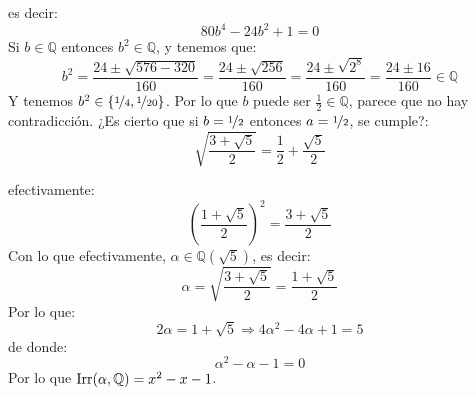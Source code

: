 \begin{ejercicio}
    es decir:
    \begin{equation*}
        80b^4 - 24b^2 +1 = 0 
    \end{equation*}
    Si $b\in \mathbb{Q}$ entonces $b^2\in \mathbb{Q}$, y tenemos que:
    \begin{equation*}
        b^2 = \frac{24 \pm \sqrt{576-320}}{160} = \frac{24\pm \sqrt{256}}{160} = \frac{24\pm\sqrt{2^8}}{160} = \frac{24\pm16}{160} \in \mathbb{Q}
    \end{equation*}
    Y tenemos $b^2 \in \{\nicefrac{1}{4}, \nicefrac{1}{20}\}$. Por lo que $b$ puede ser $\frac{1}{2}\in \mathbb{Q}$, parece que no hay contradicción. ¿Es cierto que si $b = \nicefrac{1}{2}$ entonces $a=\nicefrac{1}{2}$, se cumple?:
    \begin{equation*}
        \sqrt{\frac{3+\sqrt{5}}{2}} = \frac{1}{2} + \frac{\sqrt{5}}{2}
    \end{equation*}

    efectivamente:
    \begin{equation*}
        {\left(\frac{1+\sqrt{5}}{2}\right)}^{2} = \frac{3+\sqrt{5}}{2}
    \end{equation*}
    Con lo que efectivamente, $\alpha\in \mathbb{Q}\left(\sqrt{5}\right)$, es decir:
    \begin{equation*}
        \alpha = \sqrt{\frac{3+\sqrt{5}}{2}} = \frac{1+\sqrt{5}}{2}
    \end{equation*}
    Por lo que:
    \begin{equation*}
        2\alpha = 1+\sqrt{5} \Longrightarrow 4\alpha^2 -4\alpha + 1 = 5
    \end{equation*}
    de donde:
    \begin{equation*}
        \alpha^2 - \alpha -1 = 0
    \end{equation*}
    Por lo que $\operatorname{Irr}(\alpha,\mathbb{Q}) = x^2-x-1$.
\end{ejercicio}

